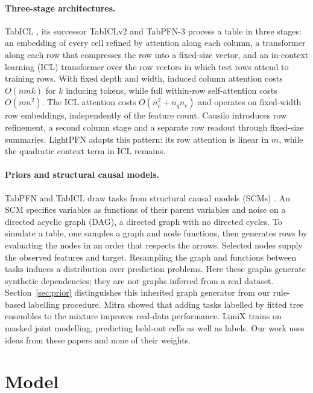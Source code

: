\documentclass[11pt]{article}
\begin{document}
\paragraph{Three-stage architectures.} TabICL \cite{qu2025}, its successor TabICLv2
\cite{tabiclv2} and TabPFN-3 \cite{tabpfn3} process a table in three stages: an embedding of every
cell refined by attention along each column, a transformer along each row that compresses the row
into a fixed-size vector, and an in-context learning (ICL) transformer over the row vectors in which
test rows attend to training rows. With fixed depth and width, induced column attention costs
$O(nmk)$ for $k$ inducing tokens, while full within-row self-attention costs $O(nm^2)$.
The ICL attention costs $O(n_c^2+n_qn_c)$ and operates on fixed-width row embeddings, independently
of the feature count. Causilo \cite{causilo} introduces row refinement, a second column stage and a
separate row readout through fixed-size summaries. LightPFN adapts this pattern: its row attention
is linear in $m$, while the quadratic context term in ICL remains.

\paragraph{Priors and structural causal models.} TabPFN and TabICL draw tasks from structural
causal models (SCMs) \cite{hollmann2023,qu2025,tabiclv2}. An SCM specifies variables as functions
of their parent variables and noise on a directed acyclic graph (DAG), a directed graph with no
directed cycles. To simulate a table, one samples a graph and node functions, then generates rows
by evaluating the nodes in an order that respects the arrows. Selected nodes supply the observed
features and target. Resampling the graph and functions between tasks induces a distribution over
prediction problems. Here these graphs generate synthetic dependencies; they are not graphs
inferred from a real dataset. Section~\ref{sec:prior} distinguishes this inherited graph generator
from our rule-based labelling procedure. Mitra \cite{mitra} showed that adding tasks labelled by fitted tree
ensembles to the mixture improves real-data performance. LimiX \cite{limix} trains on masked joint
modelling, predicting held-out cells as well as labels. Our work uses ideas from these papers and
none of their weights.

\section{Model}
\label{sec:model}
\end{document}
